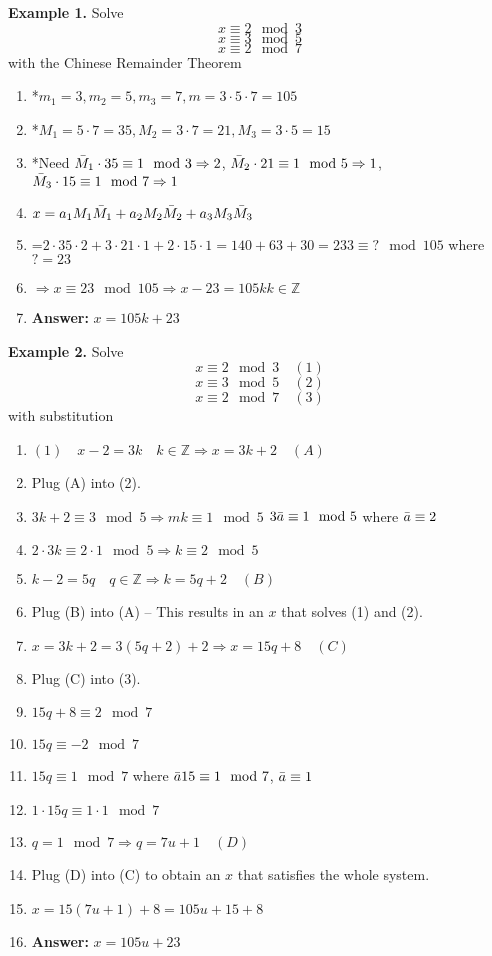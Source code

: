 \documentclass [12pt]{article}
\begin{document}
\pagebreak
\noindent\textbf{Example 1.} Solve
\[x\equiv2\mod3\]
\[x\equiv3\mod5\]
\[x\equiv2\mod7\]
with the Chinese Remainder Theorem
\begin{enumerate}[\indent]
    \item *$m_1=3,m_2=5,m_3=7,m=3\cdot5\cdot7=105$
    \item *$M_1=5\cdot7=35,M_2=3\cdot7=21,M_3=3\cdot5=15$
    \item *Need $\Bar{M}_1\cdot35\equiv1\mod3\Rightarrow2$, $\Bar{M}_2\cdot21\equiv1\mod5\Rightarrow1$, $\Bar{M}_3\cdot15\equiv1\mod7\Rightarrow1$
    \item $x=a_1M_1\Bar{M}_1+a_2M_2\Bar{M}_2+a_3M_3\Bar{M}_3$
    \item\quad=$2\cdot35\cdot2+3\cdot21\cdot1+2\cdot15\cdot1 = 140+63+30=233\equiv?\mod105$ where $? = 23$
    \item$\Rightarrow x\equiv23\mod105\Rightarrow x-23=105k$\quad $k\in\mathbb{Z}$
    \item\textbf{Answer:} $x=105k+23$
\end{enumerate}
\vspace{0.2in}
\noindent\textbf{Example 2.} Solve
\[x\equiv2\mod3\quad(1)\]
\[x\equiv3\mod5\quad(2)\]
\[x\equiv2\mod7\quad(3)\]
with substitution
\begin{enumerate}[\indent]
    \item $(1)\quad x-2=3k\quad k\in\mathbb{Z}\Rightarrow x=3k+2\quad(A)$
    \item Plug (A) into (2).
    \item\quad $3k+2\equiv3\mod5\Rightarrow mk\equiv1\mod5$ \quad\quad $3\Bar{a}\equiv1\mod5$ where $\Bar{a}\equiv2$
    \item\quad $2\cdot3k\equiv2\cdot1\mod5\Rightarrow k\equiv2\mod5$
    \item\quad $k-2=5q\quad q\in\mathbb{Z}\Rightarrow k = 5q+2\quad(B)$
    \item Plug (B) into (A) -- This results in an $x$ that solves (1) and (2).
    \item\quad $x=3k+2 = 3(5q+2)+2\Rightarrow x=15q+8\quad(C)$
    \item Plug (C) into (3).
    \item\quad $15q+8\equiv2\mod7$
    \item\quad $15q\equiv-2\mod7$
    \item\quad $15q\equiv1\mod7$ where $\Bar{a}15\equiv 1\mod7$, $\Bar{a}\equiv1$
    \item\quad $1\cdot15q\equiv1\cdot1\mod7$
    \item\quad $q=1\mod7\Rightarrow q=7u+1\quad(D)$
    \item Plug (D) into (C) to obtain an $x$ that satisfies the whole system.
    \item\quad $x=15(7u+1)+8 = 105u+15+8$
    \item\textbf{Answer:} $x=105u+23$
\end{enumerate}
\end{document}

